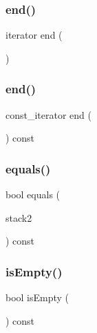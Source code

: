 \mbox{\label{classStack_acad38d52497a975bfb6f2f6acd76631f}} 
\subsubsection{\texorpdfstring{end()}{end()}\hspace{0.1cm}{\footnotesize\ttfamily [1/2]}}
{\footnotesize\ttfamily iterator end (\begin{DoxyParamCaption}{ }\end{DoxyParamCaption})\hspace{0.3cm}{\ttfamily [inline]}}

\mbox{\label{classStack_accf9a4bd0c34d4a5f6a7dab66ea10cdc}} 
\subsubsection{\texorpdfstring{end()}{end()}\hspace{0.1cm}{\footnotesize\ttfamily [2/2]}}
{\footnotesize\ttfamily const\+\_\+iterator end (\begin{DoxyParamCaption}{ }\end{DoxyParamCaption}) const\hspace{0.3cm}{\ttfamily [inline]}}

\mbox{\label{classStack_a8a06f9a4f35024fe7f29b0f87dd9a711}} 
\subsubsection{\texorpdfstring{equals()}{equals()}}
{\footnotesize\ttfamily bool equals (\begin{DoxyParamCaption}\item[{const \mbox{\hyperlink{classStack}{Stack}}$<$ Value\+Type $>$ \&}]{stack2 }\end{DoxyParamCaption}) const}

\mbox{\label{classStack_acf82f9b2937375c7b1cf3dccb3df3312}} 
\subsubsection{\texorpdfstring{is\+Empty()}{isEmpty()}}
{\footnotesize\ttfamily bool is\+Empty (\begin{DoxyParamCaption}{ }\end{DoxyParamCaption}) const}


